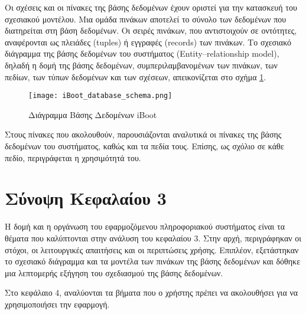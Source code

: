 Οι σχέσεις και οι πίνακες της βάσης δεδομένων έχουν οριστεί για την κατασκευή του σχεσιακού μοντέλου. Μια ομάδα πινάκων αποτελεί το σύνολο των δεδομένων που διατηρείται στη βάση δεδομένων. Οι σειρές πινάκων, που αντιστοιχούν σε οντότητες, αναφέρονται ως πλειάδες (tuples) ή εγγραφές (records) των πινάκων. Το σχεσιακό διάγραμμα της βάσης δεδομένων του συστήματος (Entity–relationship model), δηλαδή η δομή της βάσης δεδομένων, συμπεριλαμβανομένων των πινάκων, των πεδίων, των τύπων δεδομένων και των σχέσεων, απεικονίζεται στο σχήμα \ref{fig:iboot-db}.

\begin{figure}[h]
	\centering
	\texttt{[image: iBoot\_database\_schema.png]}
	\caption{Διάγραμμα Βάσης Δεδομένων iBoot}
	\label{fig:iboot-db}
\end{figure}

Στους πίνακες που ακολουθούν, παρουσιάζονται αναλυτικά οι πίνακες της βάσης δεδομένων του συστήματος, καθώς και τα πεδία τους. Επίσης, ως σχόλιο σε κάθε πεδίο, περιγράφεται η χρησιμότητά του.

\FloatBarrier

\FloatBarrier

\section{Σύνοψη Κεφαλαίου 3}
Η δομή και η οργάνωση του εφαρμοζόμενου πληροφοριακού συστήματος είναι τα θέματα που καλύπτονται στην ανάλυση του κεφαλαίου 3. Στην αρχή, περιγράφηκαν οι στόχοι, οι λειτουργικές απαιτήσεις και οι περιπτώσεις χρήσης. Επιπλέον, εξετάστηκαν το σχεσιακό διάγραμμα και τα μοντέλα των πινάκων της βάσης δεδομένων και δόθηκε μια λεπτομερής εξήγηση του σχεδιασμού της βάσης δεδομένων.

Στο κεφάλαιο 4, αναλύονται τα βήματα που ο χρήστης πρέπει να ακολουθήσει για να χρησιμοποιήσει την εφαρμογή.
